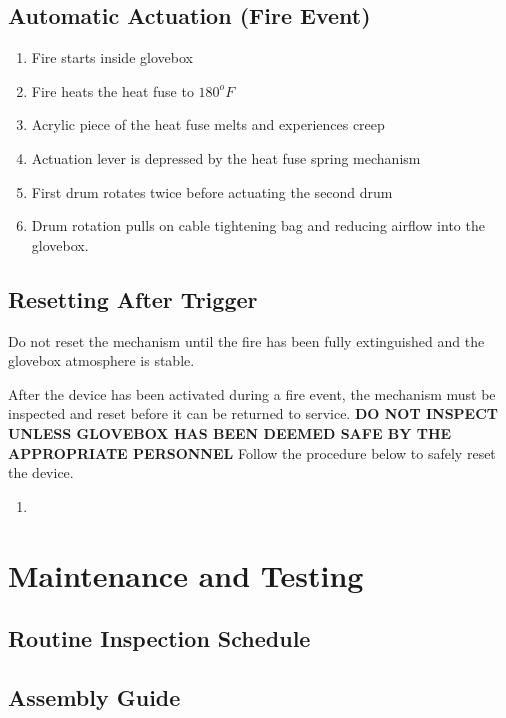 \documentclass[12pt, a4paper]{report}
\begin{document}
\section{Automatic Actuation (Fire Event)}
    \begin{enumerate}
        \item Fire starts inside glovebox
        \item Fire heats the heat fuse to $180^oF$
        \item Acrylic piece of the heat fuse melts and experiences creep
        \item Actuation lever is depressed by the heat fuse spring mechanism
        \item First drum rotates twice before actuating the second drum
        \item Drum rotation pulls on cable tightening bag and reducing airflow into the glovebox.
    \end{enumerate}

\section{Resetting After Trigger}
    \begin{caution}
        Do not reset the mechanism until the fire has been fully extinguished and the glovebox atmosphere is stable.
    \end{caution}

After the device has been activated during a fire event, the mechanism must be inspected and reset before it can be returned to service. \textbf{DO NOT INSPECT UNLESS GLOVEBOX HAS BEEN DEEMED SAFE BY THE APPROPRIATE PERSONNEL} Follow the procedure below to safely reset the device. 
    
    \begin{enumerate}
        \item 
    \end{enumerate}

\chapter{Maintenance and Testing}

\section{Routine Inspection Schedule}
    
\section{Assembly Guide}
\end{document}
